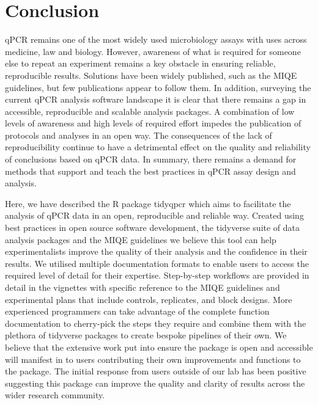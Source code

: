 \documentclass[../main.tex]{subfiles}
\begin{document}
\section{Conclusion}

qPCR remains one of the most widely used microbiology assays with uses across medicine, law and biology. However, awareness of what is required for someone else to repeat an experiment remains a key obstacle in ensuring reliable, reproducible results. 
Solutions have been widely published, such as the MIQE guidelines, but few publications appear to follow them. 
In addition, surveying the current qPCR analysis software landscape it is clear that there remains a gap in accessible, reproducible and scalable analysis packages. 
A combination of low levels of awareness and high levels of required effort impedes the publication of protocols and analyses in an open way. 
The consequences of the lack of reproducibility continue to have a detrimental effect on the quality and reliability of conclusions based on qPCR data. 
In summary, there remains a demand for methods that support and teach the best practices in qPCR assay design and analysis.


Here, we have described the R package tidyqpcr which aims to facilitate the analysis of qPCR data in an open, reproducible and reliable way. 
Created using best practices in open source software development, the tidyverse suite of data analysis packages and the MIQE guidelines we believe this tool can help experimentalists improve the quality of their analysis and the confidence in their results.
We utilised multiple documentation formats to enable users to access the required level of detail for their expertise. 
Step-by-step workflows are provided in detail in the vignettes with specific reference to the MIQE guidelines and experimental plans that include controls, replicates, and block designs. 
More experienced programmers can take advantage of the complete function documentation to cherry-pick the steps they require and combine them with the plethora of tidyverse packages to create bespoke pipelines of their own.
We believe that the extensive work put into ensure the package is open and accessible will manifest in to users contributing their own improvements and functions to the package. 
The initial response from users outside of our lab has been positive suggesting this package can improve the quality and clarity of results across the wider research community.
\end{document}
